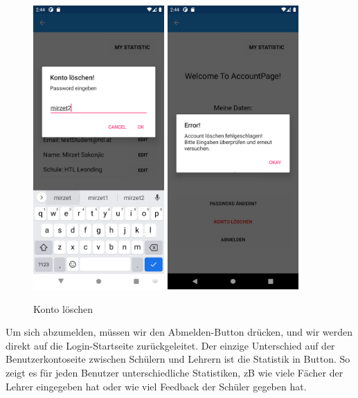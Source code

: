 \begin{figure}[h]
    \begin{center}
        \includegraphics[width=5cm]{pics/Xamarin Student/23 Delete Acc Error.png}\hfill
        \includegraphics[width=5cm]{pics/Xamarin Student/24 Delete Acc Error.png}
        \caption[MyAccount Konto löschen]{Konto löschen}
        \end{center}
\end{figure}
Um sich abzumelden, müssen wir den Abmelden-Button drücken, und wir werden direkt auf die Login-Startseite zurückgeleitet.
Der einzige Unterschied auf der Benutzerkontoseite zwischen Schülern und Lehrern ist die Statistik in Button. So zeigt es für jeden Benutzer unterschiedliche Statistiken, zB wie viele Fächer der Lehrer eingegeben hat oder wie viel Feedback der Schüler gegeben hat.
\newpage

